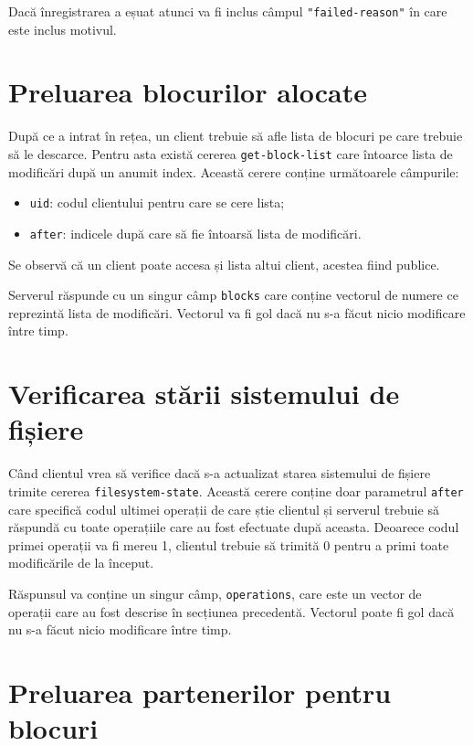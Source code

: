 \documentclass[a4wide,12pt]{report}
\newcommand{\cod}[1]{\texttt{#1}}
\begin{document}
Dacă înregistrarea a eșuat atunci va fi inclus câmpul \cod{"failed-reason"} în care este inclus motivul.

\section{Preluarea blocurilor alocate} %

După ce a intrat în rețea, un client trebuie să afle lista de blocuri pe care trebuie să le descarce. Pentru asta există
cererea \cod{get-block-list} care întoarce lista de modificări după un anumit index. Această cerere conține următoarele
câmpurile:

\begin{itemize}
    \item \cod{uid}: codul clientului pentru care se cere lista;
    \item \cod{after}: indicele după care să fie întoarsă lista de modificări.
\end{itemize}

Se observă că un client poate accesa și lista altui client, acestea fiind publice.

Serverul răspunde cu un singur câmp \cod{blocks} care conține vectorul de numere ce reprezintă lista de modificări.
Vectorul va fi gol dacă nu s-a făcut nicio modificare între timp.

\section{Verificarea stării sistemului de fișiere} %

Când clientul vrea să verifice dacă s-a actualizat starea sistemului de fișiere trimite cererea \cod{filesystem-state}.
Această cerere conține doar parametrul \cod{after} care specifică codul ultimei operații de care știe clientul și
serverul trebuie să răspundă cu toate operațiile care au fost efectuate după aceasta. Deoarece codul primei operații va
fi mereu 1, clientul trebuie să trimită 0 pentru a primi toate modificările de la început.

Răspunsul va conține un singur câmp, \cod{operations}, care este un vector de operații care au fost descrise în
secțiunea precedentă. Vectorul poate fi gol dacă nu s-a făcut nicio modificare între timp.

\section{Preluarea partenerilor pentru blocuri} %
\end{document}
